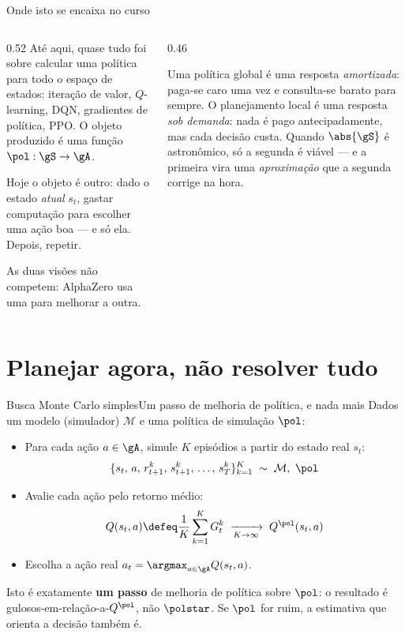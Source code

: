 \documentclass[aspectratio=169, 10pt]{beamer}
\begin{document}
\begin{frame}{Onde isto se encaixa no curso}
  \begin{columns}[T]
    \begin{column}{0.52\textwidth}
      \small
      Até aqui, quase tudo foi sobre calcular uma política \alert{para todo o
      espaço de estados}: iteração de valor, $Q$-learning, DQN, gradientes de
      política, PPO. O objeto produzido é uma função $\pol : \gS \to \gA$.

      \medskip
      Hoje o objeto é outro: dado o estado \emph{atual} $s_t$, gastar computação
      para escolher \alert{uma} ação boa — e só ela. Depois, repetir.

      \medskip
      As duas visões não competem: AlphaZero usa uma para melhorar a outra.
    \end{column}
    \begin{column}{0.46\textwidth}
      \begin{ideiabox}
        Uma política global é uma resposta \emph{amortizada}: paga-se caro uma
        vez e consulta-se barato para sempre. O planejamento local é uma resposta
        \emph{sob demanda}: nada é pago antecipadamente, mas cada decisão custa.
        Quando $\abs{\gS}$ é astronômico, só a segunda é viável — e a primeira
        vira uma \emph{aproximação} que a segunda corrige na hora.
      \end{ideiabox}
    \end{column}
  \end{columns}
\end{frame}

\section{Planejar agora, não resolver tudo}

\begin{frame}{Busca Monte Carlo simples}{Um passo de melhoria de política, e nada mais}
  \small
  Dados um modelo (simulador) $\mathcal{M}$ e uma política de simulação $\pol$:
  \begin{itemize}
    \item Para cada ação $a \in \gA$, simule $K$ episódios a partir do estado real $s_t$:
      \[
        \{s_t,\, a,\, r^k_{t+1},\, s^k_{t+1},\, \ldots,\, s^k_T\}_{k=1}^{K} \;\sim\; \mathcal{M},\ \pol
      \]
    \item Avalie cada ação pelo retorno médio:
      \[
        Q(s_t,a) \defeq \frac{1}{K}\sum_{k=1}^{K} G^k_t \;\xrightarrow[K\to\infty]{}\; Q^{\pol}(s_t,a)
      \]
    \item Escolha a ação real $a_t = \argmax_{a \in \gA} Q(s_t,a)$.
  \end{itemize}

  \begin{alertabox}
    Isto é exatamente \textbf{um passo} de melhoria de política sobre $\pol$: o
    resultado é gulosos-em-relação-a-$Q^{\pol}$, não $\polstar$. Se $\pol$ for
    ruim, a estimativa que orienta a decisão também é.
  \end{alertabox}
\end{frame}
\end{document}
